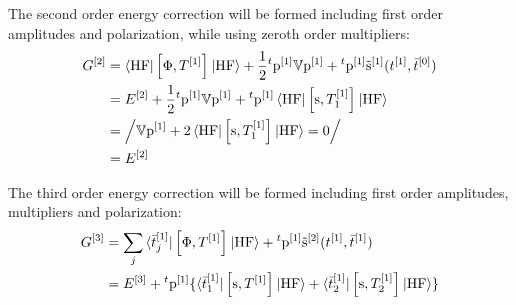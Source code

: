 The second order energy correction will be formed including first order
amplitudes and polarization, while using zeroth order multipliers:
\begin{equation}\label{eq:second-order-G}
  \begin{aligned}
  G^{[2]} &= \braket{\mathrm{HF} | \left[ \Phi, T^{[1]} \right]^{} | \mathrm{HF}}
  + \frac{1}{2}{}^t\mathrm{p}^{[1]}\mathbb{V}\mathrm{p}^{[1]} +
  {}^t\mathrm{p}^{[1]}\tilde{\mathrm{s}}^{[1]}(t_{}^{[1]}, \bar{t}_{}^{[0]}) \\
  &= E^{[2]} +
  \frac{1}{2}{}^t\mathrm{p}^{[1]}\mathbb{V}\mathrm{p}^{[1]}
  +
  {}^t\mathrm{p}^{[1]}\braket{\mathrm{HF} | \left[ \mathrm{s}, T^{[1]}_1 \right]^{} | \mathrm{HF}} \\
  &= \left/
  \mathbb{V}\mathrm{p}^{[1]} + 2\braket{\mathrm{HF} | \left[ \mathrm{s}, T_1^{[1]} \right]^{}| \mathrm{HF}} = 0
  \right/ \\
  &= E^{[2]}
  \end{aligned}
\end{equation}

The third order energy correction will be formed including first order
amplitudes, multipliers and polarization:
\begin{equation}\label{eq:third-order-G}
  \begin{aligned}
    G^{[3]} &= \sum_j\braket{\bar{t}_{j}^{[1]} | \left[ \Phi, T^{[1]} \right]^{} |
    \mathrm{HF}} + {}^t\mathrm{p}^{[1]}\tilde{\mathrm{s}}^{[2]}(t_{}^{[1]}, \bar{t}_{}^{[1]}) \\
    &= E^{[3]}
    + {}^t\mathrm{p}^{[1]}
    \lbrace
      \braket{\bar{t}_{1}^{[1]} | \left[ \mathrm{s}, T^{[1]} \right]^{} | \mathrm{HF}}
    + \braket{\bar{t}_{2}^{[1]} | \left[ \mathrm{s}, T^{[1]}_2 \right]^{} | \mathrm{HF}}
    \rbrace
  \end{aligned}
\end{equation}

